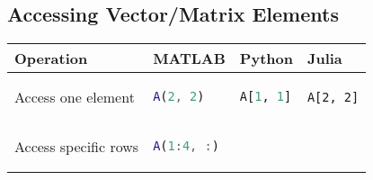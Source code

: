 \documentclass[10pt, landscape]{article}
\begin{document}
\begin{multicols}{2}
\section{Accessing Vector/Matrix
Elements}\label{accessing-vectormatrix-elements}

\begin{tabular}[]{@{}llll@{}}
\toprule
\begin{minipage}[b]{0.23\columnwidth}\raggedright\strut
Operation\strut
\end{minipage} & \begin{minipage}[b]{0.23\columnwidth}\raggedright\strut
MATLAB\strut
\end{minipage} & \begin{minipage}[b]{0.23\columnwidth}\raggedright\strut
Python\strut
\end{minipage} & \begin{minipage}[b]{0.20\columnwidth}\raggedright\strut
Julia\strut
\end{minipage}\tabularnewline
\midrule
\begin{minipage}[t]{0.23\columnwidth}\raggedright\strut
Access one element\strut
\end{minipage} & \begin{minipage}[t]{0.23\columnwidth}\raggedright\strut
\begin{lstlisting}[language=Matlab]
A(2, 2)
\end{lstlisting}
\strut
\end{minipage} & \begin{minipage}[t]{0.23\columnwidth}\raggedright\strut
\begin{lstlisting}[language=Python]
A[1, 1]
\end{lstlisting}
\strut
\end{minipage} & \begin{minipage}[t]{0.20\columnwidth}\raggedright\strut
\begin{lstlisting}
A[2, 2]
\end{lstlisting}
\strut
\end{minipage}\tabularnewline
\begin{minipage}[t]{0.23\columnwidth}\raggedright\strut
Access specific rows\strut
\end{minipage} & \begin{minipage}[t]{0.23\columnwidth}\raggedright\strut
\begin{lstlisting}[language=Matlab]
A(1:4, :)
\end{lstlisting}
\strut
\end{minipage} & \begin{minipage}[t]{0.23\columnwidth}\raggedright\strut

\end{minipage}
\end{tabular}
\end{multicols}
\end{document}
